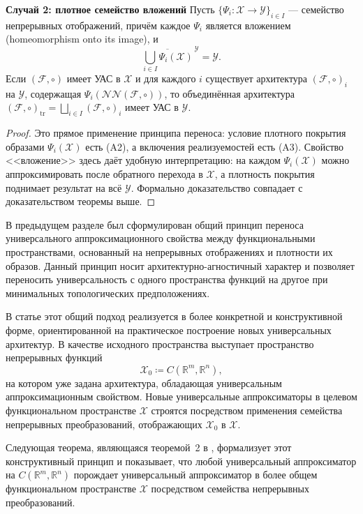 \documentclass[../NDCNNAI_main.tex]{subfiles}
\begin{document}
\textbf{Случай 2: плотное семейство вложений}
Пусть $\{\Psi_i\colon \mathcal{X}\to\mathcal{Y}\}_{i\in I}$ --- семейство непрерывных отображений, причём каждое $\Psi_i$
является вложением (homeomorphism onto its image), и
\[
\overline{\bigcup_{i\in I}\Psi_i(\mathcal{X})}^{\,\mathcal{Y}}=\mathcal{Y}.
\]
Если $(\mathcal{F},\circ)$ имеет УАС в $\mathcal{X}$ и для каждого $i$ существует архитектура
$(\mathcal{F},\circ)_i$ на $\mathcal{Y}$, содержащая $\Psi_i(\mathcal{NN}(\mathcal{F},\circ))$,
то объединённая архитектура $(\mathcal{F},\circ)_{\mathrm{tr}}=\bigsqcup_{i\in I}(\mathcal{F},\circ)_i$
имеет УАС в $\mathcal{Y}$.
\begin{proof}
Это прямое применение принципа переноса: условие плотного покрытия образами $\Psi_i(\mathcal{X})$
есть (A2), а включения реализуемостей есть (A3). Свойство <<вложение>> здесь даёт удобную
интерпретацию: на каждом $\Psi_i(\mathcal{X})$ можно аппроксимировать после
обратного перехода в $\mathcal{X}$, а плотность покрытия поднимает результат на всё $\mathcal{Y}$.
Формально доказательство совпадает с доказательством теоремы выше.
\end{proof}

В предыдущем разделе был сформулирован общий принцип переноса универсального
аппроксимационного свойства между функциональными пространствами, основанный на
непрерывных отображениях и плотности их образов.
Данный принцип носит архитектурно-агностичный характер и позволяет переносить
универсальность с одного пространства функций на другое при минимальных
топологических предположениях.

В статье \cite{Kratsios2021} этот общий подход реализуется в более конкретной и
конструктивной форме, ориентированной на практическое построение новых
универсальных архитектур. В качестве исходного пространства выступает
пространство непрерывных функций
\[
\mathcal{X}_0 \coloneq C(\mathbb{R}^m,\mathbb{R}^n),
\]
на котором уже задана архитектура, обладающая универсальным аппроксимационным
свойством. Новые универсальные аппроксиматоры в целевом функциональном
пространстве $\mathcal{X}$ строятся посредством применения семейства непрерывных
преобразований, отображающих $\mathcal{X}_0$ в $\mathcal{X}$.

Следующая теорема, являющаяся теоремой~2 в \cite{Kratsios2021}, формализует этот
конструктивный принцип и показывает, что любой универсальный аппроксиматор на
$C(\mathbb{R}^m,\mathbb{R}^n)$ порождает универсальный аппроксиматор в более общем
функциональном пространстве $\mathcal{X}$ посредством семейства непрерывных
преобразований.
\end{document}
